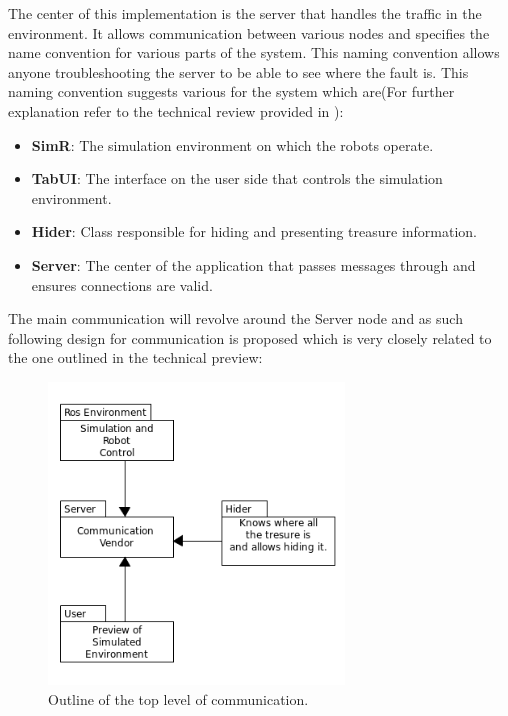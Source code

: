 \documentclass{report}
\begin{document}
      The center of this implementation is the server that handles the traffic in the environment. It allows communication between various nodes and specifies the name convention for various parts of the system. This naming convention allows anyone troubleshooting the server to be able to see where the fault is. This naming convention suggests various for the system which are(For further explanation refer to the technical review provided in \cite{technical}):
        \begin{itemize}
          \item \textbf{SimR}: The simulation environment on which the robots operate.
          \item \textbf{TabUI}: The interface on the user side that controls the simulation environment.
          \item \textbf{Hider}: Class responsible for hiding and presenting treasure information.
          \item \textbf{Server}: The center of the application that passes messages through and ensures connections are valid. 
        \end{itemize}

      The main communication will revolve around the Server node and as such following design for communication is proposed which is very closely related to the one outlined in the technical preview\cite{technical}:

        \begin{figure}[!ht]  
          \centering
            \includegraphics[width=0.7\textwidth]{figures/mainCommunication.png}
            \caption{Outline of the top level of communication.}
        \end{figure}
\end{document}
